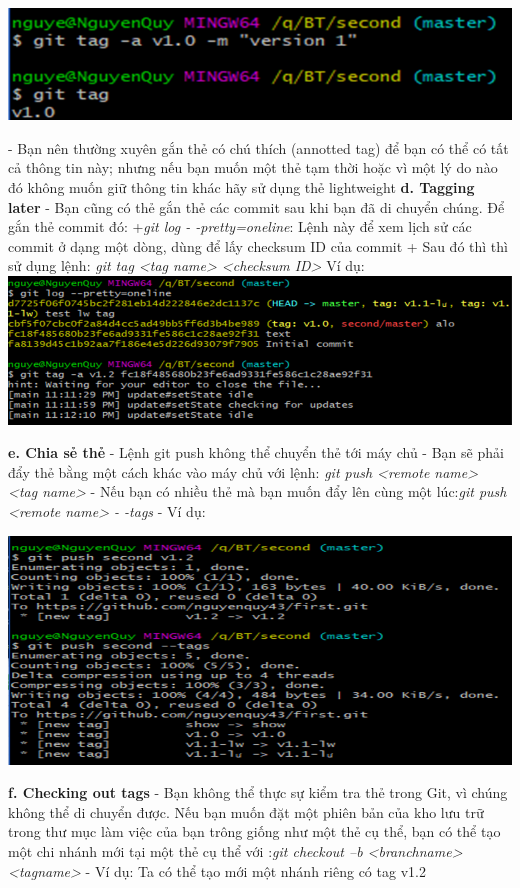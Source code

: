 \documentclass[12pt,a4paper]{report}
\begin{document}
	\includegraphics[width=0.8\linewidth]{screenshot043}

	\label{fig:screenshot043}\vskip 0.4cm\vskip 0.4cm

- Bạn nên thường xuyên gắn thẻ có chú thích (annotted tag) để bạn có thể có tất cả thông tin này; nhưng nếu bạn muốn một thẻ tạm thời hoặc vì một lý do nào đó không muốn giữ thông tin khác hãy sử dụng thẻ lightweight\vskip 0.4cm
{\bf d. Tagging later} \vskip 0.4cm
- Bạn cũng có thẻ gắn thẻ các commit sau khi bạn đã di chuyển chúng. Để gắn thẻ commit đó: \vskip 0.4cm
+{\it git log - -pretty=oneline}: Lệnh này để xem lịch sử các commit ở dạng một dòng, dùng để lấy checksum ID của commit\vskip 0.4cm
+ Sau đó thì thì sử dụng lệnh: {\it git tag  <tag name> <checksum ID>}\vskip 0.4cm
Ví dụ: 
\vskip 0.4cm
	\includegraphics[width=0.8\linewidth]{screenshot044}

	\label{fig:screenshot044}
\vskip 0.4cm\vskip 0.4cm
{\bf e. Chia sẻ thẻ} \vskip 0.4cm
- Lệnh git push không thể chuyển thẻ tới máy chủ\vskip 0.4cm
- Bạn sẽ phải đẩy thẻ bằng một cách khác vào máy chủ với lệnh: {\it git push <remote name> <tag name>}\vskip 0.4cm
- Nếu bạn có nhiều thẻ mà bạn muốn đẩy lên cùng một lúc:{\it git push <remote name> - -tags}\vskip 0.4cm
- Ví dụ:\vskip 0.4cm

	\includegraphics[width=0.8\linewidth]{screenshot045}

	\label{fig:screenshot045}
\vskip 0.4cm\vskip 0.4cm
{\bf f. Checking out tags} \vskip 0.4cm
- Bạn không thể thực sự kiểm tra thẻ trong Git, vì chúng không thể di chuyển được. Nếu bạn muốn đặt một phiên bản của kho lưu trữ trong thư mục làm việc của bạn trông giống như một thẻ cụ thể, bạn có thể tạo một chi nhánh mới tại một thẻ cụ thể với :{\it git checkout –b <branchname> <tagname>}\vskip 0.4cm
- Ví dụ: Ta có thể tạo mới một nhánh riêng có tag v1.2\vskip 0.4cm
\end{document}
